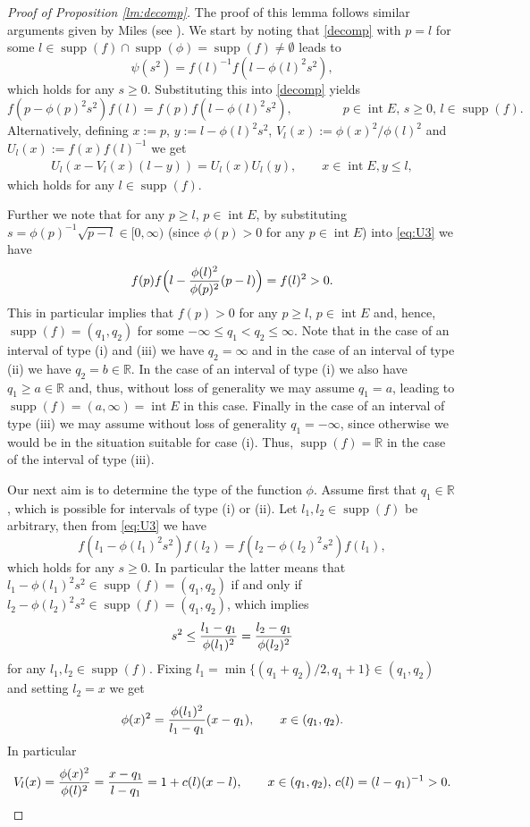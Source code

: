 \documentclass[11pt,a4paper]{article}
\theoremstyle{plain}
\theoremstyle{definition}
\theoremstyle{remark}
\DeclareMathOperator\supp{supp}
\def\RR{\mathbb{R}}
\newcommand{\inter}{\operatorname{int}}
\begin{document}
    \begin{proof}[Proof of Proposition \ref{lm:decomp}]    
    The proof of this lemma follows similar arguments given by Miles (see \cite[pp. 376-377]{Miles_IRS}). We start by noting that \eqref{decomp} with $p=l$ for some $l \in \supp(f)\cap \supp(\phi)=\supp(f)\neq \emptyset$ leads to  
    \[
        \psi(s^2)=f(l)^{-1}f(l-\phi(l)^2s^2),
    \]
    which holds for any $s\ge 0$. Substituting this into \eqref{decomp} yields
    \begin{equation}\label{eq:U3}
        f(p-\phi(p)^2s^2)f(l)=f(p)f(l-\phi(l)^2s^2), \qquad\qquad p\in \inter E,\, s\ge 0,\, l\in \supp(f).
    \end{equation}
    Alternatively, defining $x:=p$, $y:=l-\phi(l)^2s^2$, $V_l(x):=\phi(x)^2/\phi(l)^2$ and 
    $U_l(x):= f(x)f(l)^{-1}$ we get
    \begin{align}\label{eq:U}
        U_l(x-V_l(x)(l-y))=U_l(x)U_l(y),\qquad x\in\inter E, y\leq l,
    \end{align}
    which holds for any $l\in\supp(f)$.

    
    Further we note that for any $p\ge l$, $p\in\inter E$, by substituting $s=\phi(p)^{-1}\sqrt{p-l}\in [0,\infty)$ (since $\phi(p)>0$ for any $p\in\inter E$) into \eqref{eq:U3} we have
    \[
        f(p)f\Big(l-{\phi(l)^2\over \phi(p)^2}(p-l)\Big)=f(l)^2>0.
    \]
    This in particular implies that $f(p)>0$ for any $p\ge l$, $p\in\inter E$ and, hence, $\supp (f) = (q_1,q_2)$ for some $-\infty\leq q_1<q_2\leq \infty$. Note that in the case of an interval of type (i) and (iii) we have $q_2=\infty$ and in the case of an interval of type (ii) we have $q_2=b\in\RR$. In the case of an interval of type (i) we also have $q_1\ge a\in \RR$ and, thus, without loss of generality we may assume $q_1=a$, leading to $\supp(f)=(a,\infty)=\inter E$ in this case. Finally in the case of an interval of type (iii) we may assume without loss of generality $q_1=-\infty$, since otherwise we would be in the situation suitable for case (i). Thus, $\supp(f)=\RR$ in the case of the interval of type (iii).

    Our next aim is to determine the type of the function $\phi$. Assume first that $q_1\in\RR$, which is possible for intervals of type (i) or (ii). Let $l_1,l_2\in\supp(f)$ be arbitrary, then from \eqref{eq:U3} we have
    \[
        f(l_1-\phi(l_1)^2s^2)f(l_2)=f(l_2-\phi(l_2)^2s^2)f(l_1),
    \]
    which holds for any $s\ge 0$. In particular the latter means that $l_1-\phi(l_1)^2s^2\in \supp (f) = (q_1,q_2)$ if and only if $l_2-\phi(l_2)^2s^2\in\supp (f) = (q_1,q_2)$, which implies
    \[
        s^2\leq {l_1-q_1\over \phi(l_1)^2}={l_2-q_1\over \phi(l_2)^2}
    \]
    for any $l_1,l_2\in\supp(f)$. Fixing $l_1=\min\{(q_1+q_2)/2,q_1+1\}\in(q_1,q_2)$ and setting $l_2=x$ we get
    \[
        \phi(x)^2={\phi(l_1)^2\over l_1-q_1}(x-q_1),\qquad x\in (q_1,q_2).
    \]
    In particular
    \begin{equation}\label{eq:V1}
        V_l(x)={\phi(x)^2\over \phi(l)^2}={x-q_1\over l-q_1}=1+c(l)(x-l),\qquad x\in (q_1,q_2),\, c(l)=(l-q_1)^{-1}>0.
    \end{equation}  
    

\end{proof}
\end{document}
